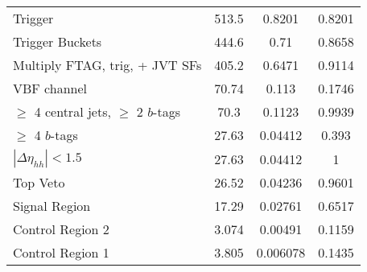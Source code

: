 \begin{table}
{\begin{tabular}{lccc}
Trigger                                &     513.5 &                 0.8201 &             0.8201 \\
Trigger Buckets                        &     444.6 &                   0.71 &             0.8658 \\
Multiply FTAG, trig, + JVT SFs         &     405.2 &                 0.6471 &             0.9114 \\
VBF channel                            &     70.74 &                  0.113 &             0.1746 \\
$\ge$ 4 central jets, $\ge$ 2 $b$-tags &      70.3 &                 0.1123 &             0.9939 \\
$\ge$ 4 $b$-tags                       &     27.63 &                0.04412 &              0.393 \\
$|\Delta\eta_{hh}| < 1.5$              &     27.63 &                0.04412 &                  1 \\
Top Veto                               &     26.52 &                0.04236 &             0.9601 \\
Signal Region                          &     17.29 &                0.02761 &             0.6517 \\
Control Region 2                       &     3.074 &                0.00491 &             0.1159 \\
Control Region 1                       &     3.805 &               0.006078 &             0.1435 \\
\bottomrule
\end{tabular}
} \ 
\end{table}